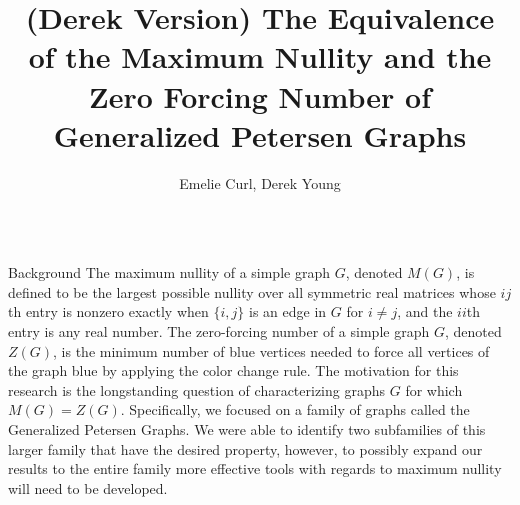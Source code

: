 \documentclass[final]{beamer}
\title{(Derek Version) The Equivalence of the Maximum Nullity and the Zero Forcing Number of Generalized Petersen Graphs}
\author{Emelie Curl, Derek Young }
\institute{Iowa State University, Ames, IA}
\def\red{\color{red}}
\newcommand{\R}{\mathbb{R}}
\newcommand{\Rnn}{\R^{n\times n}}
\newcommand{\bit}{\begin{itemize}}
\begin{document}
\begin{frame}{}
\begin{columns}[t]

\begin{column}{0.23\linewidth} %

\begin{block}{\red Background}
The maximum nullity of a simple graph $G$, denoted $M(G)$, is defined to be the largest possible nullity over all symmetric real matrices whose $ij$th entry is nonzero exactly when $\{i,j\}$ is an edge in $G$ for $i\neq j$, and the {$ii$}th entry is any real number. The zero-forcing number of a simple graph $G$, denoted $Z(G)$, is the minimum number of blue vertices needed to force all vertices of the graph blue by applying the color change rule. The motivation for this research is the longstanding question of characterizing graphs $G$ for which $M(G)=Z(G)$. Specifically, we focused on a family of graphs called the Generalized Petersen Graphs. We were able to identify two subfamilies of this larger family that have the desired property, however, to possibly expand our results to the entire family more effective tools with regards to maximum nullity will need to be developed.
\end{block}

\end{column}
\end{columns}
\end{frame}
\end{document}
